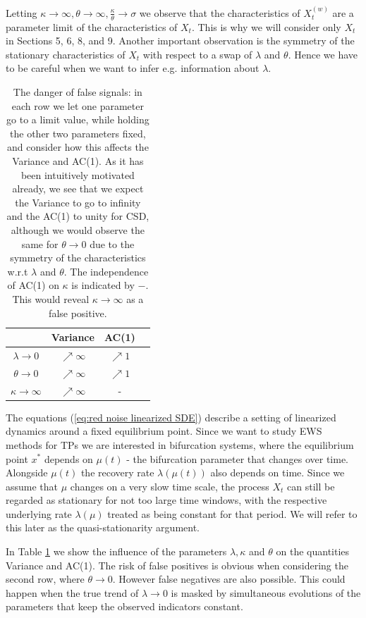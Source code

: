 \documentclass[%
thesis=student,%
coverpage=false,%
titlepage=false,%
headmarks=true, %
english,%
font=libertine, %
math=newpxtx, %
BCOR=5mm,%
coverBCOR=11mm%
]{tumbook}
\begin{document}
Letting $\kappa \rightarrow \infty, \theta \rightarrow \infty, \frac{\kappa}{\theta} \rightarrow \sigma$ we observe that the characteristics of $X_{t}^{(w)}$ are a parameter limit of the characteristics of $X_{t}$. This is why we will consider only $X_{t}$ in Sections 5, 6, 8, and 9.
Another important observation is the symmetry of the stationary characteristics of $X_{t}$ with respect to a swap of $\lambda$ and $\theta$. Hence we have to be careful when we want to infer e.g. information about $\lambda$.

\begin{table}[h!]
\centering
\begin{tabular}{|c|c|c|c|}
\hline
& Variance & AC(1)\\
\hline
$\lambda \rightarrow 0$ & $\nearrow \infty$ & $\nearrow 1$ \\
$\theta \rightarrow 0$  & $\nearrow \infty$ & $\nearrow 1$ \\
$\kappa \rightarrow \infty$ & $\nearrow \infty$ & - \\    
\hline
\end{tabular}
\caption{The danger of false signals: in each row we let one parameter go to a limit value, while holding the other two parameters fixed, and consider how this affects the Variance and AC(1). As it has been intuitively motivated already, we see that we expect the Variance to go to infinity and the AC(1) to unity for CSD, although we would observe the same for $\theta \rightarrow 0$ due to the symmetry of the characteristics w.r.t $\lambda$ and $\theta$. The independence of AC(1) on $\kappa$ is indicated by $-$. This would reveal $\kappa \rightarrow \infty$ as a false positive.}
\label{tab:danger_of_false_signals}
\end{table}

The equations (\ref{eq:red noise linearized SDE}) describe a setting of linearized dynamics around a fixed equilibrium point. Since we want to study EWS methods for TPs we are interested in bifurcation systems, where the equilibrium point $x^{*}$ depends on $\mu(t)$ - the bifurcation parameter that changes over time. Alongside $\mu(t)$ the recovery rate $\lambda(\mu(t))$ also depends on time. Since we assume that $\mu$ changes on a very slow time scale, the process $X_{t}$ can still be regarded as stationary for not too large time windows, with the respective underlying rate $\lambda(\mu)$ treated as being constant for that period. We will refer to this later as the quasi-stationarity argument.

In Table \ref{tab:danger_of_false_signals} we show the influence of the parameters $\lambda, \kappa$ and $\theta$ on the quantities Variance and AC(1). The risk of false positives is obvious when considering the second row, where $\theta \rightarrow 0$. However false negatives are also possible. This could happen when the true trend of $\lambda \rightarrow 0$ is masked by simultaneous evolutions of the parameters that keep the observed indicators constant.
\end{document}

